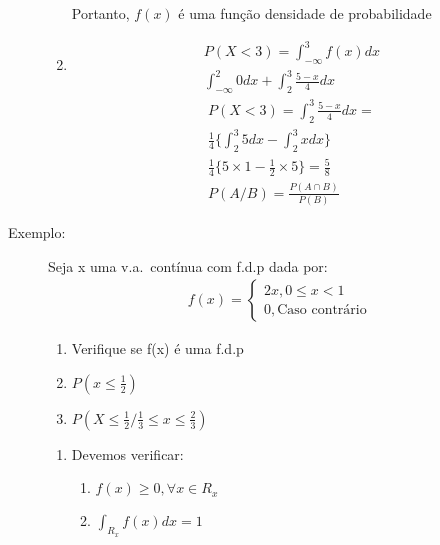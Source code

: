 \documentclass[11pt,a4paper]{book}
\begin{document}
\begin{description}
\begin{enumerate}[label=(\alph*)]
\begin{enumerate}[leftmargin=*, label=\Roman*., widest=IV, align=left]
           \end{enumerate}
           Portanto, $f(x)$ é uma função densidade de probabilidade 
         \item 
           \begin{align*}
             P(X<3)= \int_{-\infty}^{3} f(x)dx \\
             \int_{-\infty}^{2}0 dx +      \int_{2}^{3} \frac{5-x}{4} dx 
           \end{align*}
           \begin{align*}
             P(X<3)=\int_{2}^{3} \frac{5-x}{4} dx =\\
             \frac{1}{4}\{ \int_{2}^{3} 5 dx - \int_{2}^{3} x dx \}\\
             \frac{1}{4}\{ 5\times 1- \frac{1}{2}\times 5\}= \frac{5}{8}\\
             P(A/B)=\frac{P(A\cap B)}{P(B)}
           \end{align*}
       \end{enumerate}
     \item [Exemplo:] Seja x uma v.a.\ contínua com f.d.p dada por:
       \begin{align*}
         f(x)= 
         \begin{cases}
           2x, 0\le x < 1 \\ 
           0, \text{Caso contrário}
         \end{cases}
       \end{align*}
       \begin{enumerate}[label=(\alph*)]
         \item Verifique se f(x) é uma f.d.p
         \item$ P(x\le \frac{1}{2})$
         \item $P(X\le \frac{1}{2} / \frac{1}{3} \le x \le \frac{2}{3})$
       \end{enumerate}
       \begin{enumerate}[label=(\alph*)]
         \item 
           Devemos verificar: 
           \begin{enumerate}[leftmargin=*, label=\Roman*., widest=IV, align=left] %
             \item $f(x)\geq 0, \forall x \in R_{x}$
             \item $\int_{R_{x}} f(x)dx=1$


\end{enumerate}
\end{enumerate}
\end{description}
\end{document}
